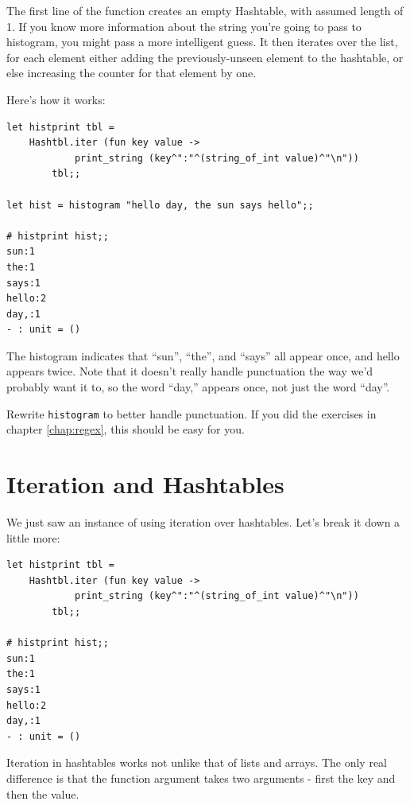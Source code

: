 \documentclass[10pt]{book}
\begin{document}
{

The first line of the function creates an empty Hashtable, with assumed 
length of 1. If you know more information about the string you're going 
to pass to histogram, you might pass a more intelligent guess. It then 
iterates over the list, for each element either adding the previously-unseen
element to the hashtable, or else increasing the counter for that 
element by one.


Here's how it works:

\beforeverb
\begin{verbatim}
let histprint tbl = 
	Hashtbl.iter (fun key value ->
			print_string (key^":"^(string_of_int value)^"\n"))
		tbl;;
		
let hist = histogram "hello day, the sun says hello";;

# histprint hist;;
sun:1
the:1
says:1
hello:2
day,:1
- : unit = ()
\end{verbatim}
\afterverb
%
The histogram indicates that ``sun'', ``the'', and ``says'' all appear once, and hello appears twice. Note that it doesn't really handle punctuation the way we'd probably want it to, so the word ``day,'' appears once, not just the word ``day''.

\begin{exercise}
Rewrite {\tt histogram} to better handle punctuation. If you did the exercises in chapter \ref{chap:regex}, this should be easy for you.
\end{exercise}

\section{Iteration and Hashtables}


We just saw an instance of using iteration over hashtables. Let's break it down a little more:

\beforeverb
\begin{verbatim}
let histprint tbl = 
	Hashtbl.iter (fun key value ->
			print_string (key^":"^(string_of_int value)^"\n"))
		tbl;;

# histprint hist;;
sun:1
the:1
says:1
hello:2
day,:1
- : unit = ()
\end{verbatim}
\afterverb

Iteration in hashtables works not unlike that of lists and arrays.
The only real difference is that the function argument takes two 
arguments - first the key and then the value.

}
\end{document}
